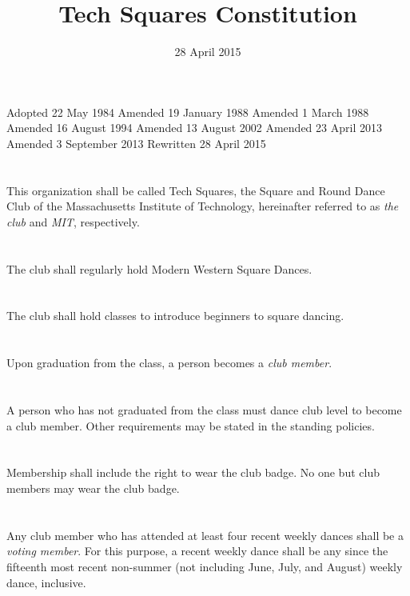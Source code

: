\documentclass{bylaws}
\title{Tech Squares Constitution}
\date{28 April 2015}
\begin{document}
\maketitle

\begin{history}
Adopted 22 May 1984
Amended 19 January 1988
Amended 1 March 1988
Amended 16 August 1994
Amended 13 August 2002
Amended 23 April 2013
Amended 3 September 2013
Rewritten 28 April 2015
\end{history}


\section{}This organization shall be called Tech Squares, the Square and Round Dance Club of the Massachusetts Institute of Technology, hereinafter referred to as \textit{the club} and \textit{MIT}, respectively.
\section{}The club shall regularly hold Modern Western Square Dances.
\section{}The club shall hold classes to introduce beginners to square dancing.


\section{}Upon graduation from the class, a person becomes a \textit{club member}.
\section{}A person who has not graduated from the class must dance club level to become a club member. Other requirements may be stated in the standing policies.
\section{}Membership shall include the right to wear the club badge. No one but club members may wear the club badge.
\section{}Any club member who has attended at least four recent weekly dances shall be a \textit{voting member}. For this purpose, a recent weekly dance shall be any since the fifteenth most recent non-summer (not including June, July, and August) weekly dance, inclusive.
\end{document}
